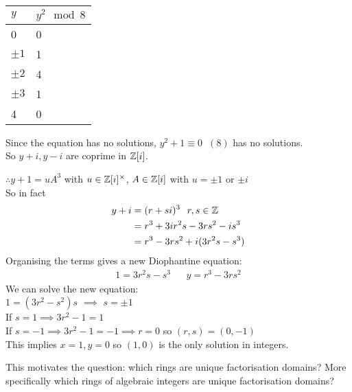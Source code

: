 \documentclass[11pt]{article}
\begin{document}
\begin{center}

\begin{tabular}{l|l}
\hline
$y$       & $y^2 \mod 8 $ \\ \hline
0       & 0             \\ 
$\pm 1$ & 1             \\ 
$\pm 2$ & 4             \\ 
$\pm 3$ & 1             \\ 
4       & 0             \\ 
\end{tabular}

\end{center}
Since the equation has no solutions, $y^2 + 1 \equiv 0 \hspace{7pt} (8)$ has no solutions. 
$ $\\
So $y+i, y-i$ are coprime in $\mathbb{Z}[i]$.


$\therefore y+1 = uA^3$ with $u \in \mathbb{Z}[i]^\times $, $A \in \mathbb{Z}[i]$ with $u=\pm 1 $ or $\pm i$
$ $\\[1em]
So in fact
\begin{align*}
	y+i &= (r+si)^3 \hspace{7pt} r,s \in \mathbb{Z} \\
	& = r^3 + 3ir^2s - 3rs^2 - is^3\\
	& = r^3 - 3rs^2 + i(3r^2s - s^3)
\end{align*}
Organising the terms gives a new Diophantine equation:
\begin{align*}
	1= 3r^2s - s^3 && y = r^3 - 3rs^2
\end{align*}
We can solve the new equation: 
$ $\\[1em]
$1= (3r^2-s^2)s$ $\implies $ $s= \pm 1$
$ $\\[1em]
If $s=1 \implies 3r^2 - 1 =1 $ \lightning\\
If $s=-1 \implies 3r^2 - 1 = -1 \implies r =0 $ \hspace{7pt} so $(r,s) = (0,-1)$
$ $\\[1em]
This implies $x=1, y= 0$ so $(1,0)$ is the only solution in integers.

$ $\\[1em]
This motivates the question: which rings are unique factorisation domains? 
More specifically which rings of algebraic integers are unique factorisation domains?
\end{document}
